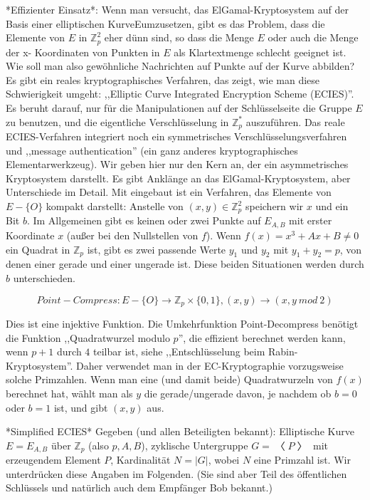 \documentclass[a4paper]{article}
\begin{document}
\begin{multicols}{3}
{{{{*Effizienter Einsatz*: Wenn man versucht, das ElGamal-Kryptosystem auf der Basis einer elliptischen KurveEumzusetzen, gibt es das Problem, dass die Elemente  von $E$ in $\mathbb{Z}^2_p$ eher dünn sind, so dass die Menge $E$ oder auch die Menge der x-
Koordinaten von Punkten in $E$ als Klartextmenge schlecht geeignet ist. Wie soll man also gewöhnliche Nachrichten auf Punkte auf der Kurve abbilden? Es gibt ein reales kryptographisches Verfahren, das zeigt, wie man diese Schwierigkeit umgeht: ,,Elliptic Curve Integrated Encryption Scheme (ECIES)''. Es beruht darauf, nur für die Manipulationen auf der Schlüsselseite die Gruppe $E$ zu benutzen, und die eigentliche Verschlüsselung in $\mathbb{Z}^*_p$ auszuführen. Das reale ECIES-Verfahren integriert noch ein symmetrisches Verschlüsselungsverfahren und ,,message authentication'' (ein ganz anderes kryptographisches Elementarwerkzeug). Wir geben hier nur den Kern an, der ein asymmetrisches Kryptosystem darstellt. Es gibt Anklänge an das ElGamal-Kryptosystem, aber Unterschiede im Detail.
Mit eingebaut ist ein Verfahren, das Elemente von $E-\{O\}$ kompakt darstellt: Anstelle von $(x,y)\in\mathbb{Z}^2_p$ speichern wir $x$ und ein Bit $b$. Im Allgemeinen gibt es keinen oder zwei Punkte auf $E_{A,B}$ mit erster Koordinate $x$ (außer bei den Nullstellen von $f$). Wenn $f(x)=x^3+Ax+B\not= 0$ ein Quadrat in $\mathbb{Z}_p$ ist, gibt es zwei passende Werte $y_1$ und $y_2$ mit $y_1+y_2=p$, von denen einer gerade und einer ungerade ist. Diese beiden Situationen werden durch $b$ unterschieden.

$$Point-Compress: E-\{O\}\rightarrow\mathbb{Z}_p \times\{0,1\},(x,y)\rightarrow (x,y\ mod\ 2)$$

Dies ist eine injektive Funktion. Die Umkehrfunktion Point-Decompress benötigt die Funktion ,,Quadratwurzel modulo $p$'', die effizient berechnet werden kann, wenn $p+1$ durch $4$ teilbar ist, siehe ,,Entschlüsselung beim Rabin-Kryptosystem''. Daher verwendet man in der EC-Kryptographie vorzugsweise solche Primzahlen. Wenn man eine (und damit beide) Quadratwurzeln von $f(x)$ berechnet hat, wählt man als $y$ die gerade/ungerade davon, je nachdem ob $b=0$ oder $b=1$ ist, und gibt $(x,y)$ aus.

*Simplified ECIES* 
Gegeben (und allen Beteiligten bekannt): Elliptische Kurve $E=E_{A,B}$ über $\mathbb{Z}_p$ (also $p,A,B$), zyklische Untergruppe $G=〈P〉$ mit erzeugendem Element $P$, Kardinalität $N=|G|$, wobei $N$ eine Primzahl ist. Wir unterdrücken diese Angaben im Folgenden.
(Sie sind aber Teil des öffentlichen Schlüssels und natürlich auch dem Empfänger Bob bekannt.)

}}}}
\end{multicols}
\end{document}
